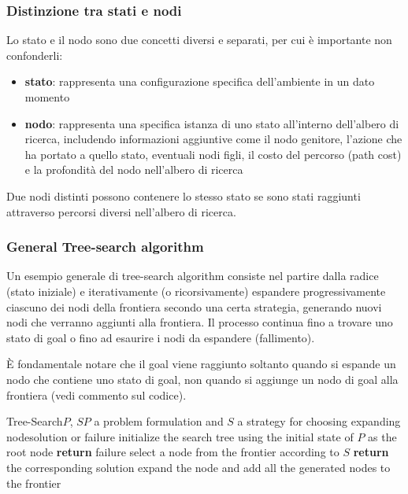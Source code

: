 \subsubsection*{Distinzione tra stati e nodi}
Lo stato e il nodo sono due concetti diversi e separati, per cui è importante non confonderli:
\begin{itemize}
	\item \textbf{stato}: rappresenta una configurazione specifica dell'ambiente in un dato momento
	\item \textbf{nodo}: rappresenta una specifica istanza di uno stato all'interno dell'albero di ricerca, includendo
	informazioni aggiuntive come il nodo genitore, l'azione che ha portato a quello stato, eventuali nodi figli, il costo del
	percorso (path cost) e la profondità del nodo nell'albero di ricerca
\end{itemize}
Due nodi distinti possono contenere lo stesso stato se sono stati raggiunti attraverso percorsi diversi nell'albero di ricerca.

\subsubsection*{General Tree-search algorithm}
Un esempio generale di tree-search algorithm consiste nel partire dalla radice (stato iniziale) e iterativamente
(o ricorsivamente) espandere progressivamente ciascuno dei nodi della frontiera secondo una certa strategia, generando
nuovi nodi che verranno aggiunti alla frontiera. Il processo continua fino a trovare uno stato di goal o fino ad esaurire
i nodi da espandere (fallimento).

È fondamentale notare che il goal viene raggiunto soltanto quando si espande un nodo che contiene uno stato di goal, non
quando si aggiunge un nodo di goal alla frontiera (vedi commento sul codice).

\begin{algo}{Tree-Search}{$P$, $S$}{$P$ a problem formulation and $S$ a strategy for choosing expanding node}{solution or failure}
	\State initialize the search tree using the initial state of $P$ as the root node
	\Loop
			\State \textbf{return} failure
		\EndIf
		\State select a node from the frontier according to $S$
			\State \textbf{return} the corresponding solution 
		\Else
			\State expand the node and add all the generated nodes to the frontier
		\EndIf
	\EndLoop
\end{algo}

